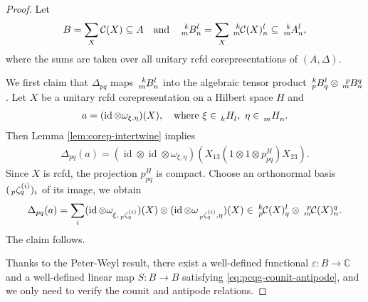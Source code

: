 \documentclass[11pt]{article}
\DeclareMathOperator{\id}{id}
\newcommand{\C}{\mathbb{C}}
\newcommand{\Gr}[5]{\,\tensor*[^{#2}_{#4}]{#1}{^{#3}_{#5}}}%
\newcommand{\Grd}[3]{\Gr{#1}{}{}{#2}{#3}}
\theoremstyle{definition}
\numberwithin{equation}{section}
\begin{document}
\begin{proof}
  Let
  \begin{align*}
    B = \sum_{X} \mathcal{C}(X) \subseteq A \quad \text{and} \quad \Gr{B}{k}{l}{m}{n} = \sum_{X}
    \Gr{\mathcal{C}(X)}{k}{l}{m}{n} \subseteq \Gr{A}{k}{l}{m}{n},
  \end{align*}
  where the sums are taken over all unitary rcfd corepresentations of $(A,\Delta)$.

  We first claim that $\Delta_{pq}$ maps $\Gr{B}{k}{l}{m}{n}$ into the algebraic tensor product
  $\Gr{B}{k}{l}{p}{q} \otimes \Gr{B}{p}{q}{m}{n}$.  Let $X$ be a unitary rcfd corepresentation on a
  Hilbert space $H$ and
  \begin{align*}
    a = (\id\otimes
  \omega_{\xi,\eta})(X), \quad \text{where } \xi \in \Grd{H}{k}{l}, \ \eta\in \Grd{H}{m}{n}.
  \end{align*}
 Then Lemma \ref{lem:corep-intertwine} implies
  \begin{align*}
    \Delta_{pq}(a) = (\id \otimes \id \otimes \omega_{\xi,\eta})(X_{13}(1\otimes 1 \otimes p^{H}_{pq})X_{23}).
  \end{align*}
  Since $X$ is rcfd,  the projection $p^{H}_{pq}$ is compact. Choose an orthonormal
  basis $(\Gr{\zeta}{}{(i)}{p}{q})_{i}$ of its image, we obtain
  \begin{align*}
    \Delta_{pq}(a) = \sum_{i} (\id \otimes \omega_{\xi,\Gr{\zeta}{}{(i)}{p}{q}})(X) \otimes (\id \otimes
    \omega_{\Gr{\zeta}{}{(i)}{p}{q},\eta})(X) \in \Gr{\mathcal{C}(X)}{k}{l}{p}{q} \otimes \Gr{\mathcal{C}(X)}{p}{q}{m}{n}.
  \end{align*}
  The claim follows.
  
  Thanks to the Peter-Weyl result, there exist a well-defined functional $\varepsilon \colon B\to
  \C$ and a well-defined linear map $S\colon B\to B$ satisfying \eqref{eq:pcqg-counit-antipode}, and
  we only need to verify the counit and antipode relations.  


\end{proof}
\end{document}
